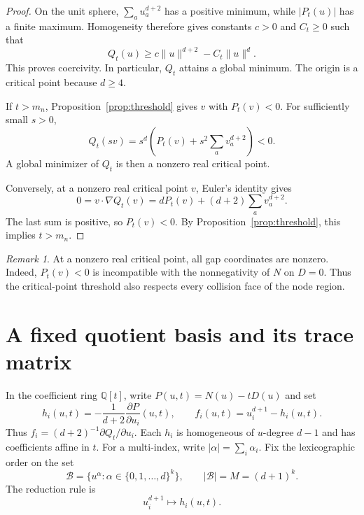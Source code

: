 \documentclass[11pt,leqno]{amsart}
\theoremstyle{definition}
\theoremstyle{remark}
\newtheorem{remark}[theorem]{Remark}
\numberwithin{equation}{section}
\newcommand{\Q}{\mathbb Q}
\newcommand{\B}{\mathcal B}
\newcommand{\abs}[1]{\lvert #1\rvert}
\newcommand{\norm}[1]{\lVert #1\rVert}
\begin{document}
\begin{proof}
On the unit sphere, $\sum_a u_a^{d+2}$ has a positive minimum, while
$\abs{P_t(u)}$ has a finite maximum. Homogeneity therefore gives constants
$c>0$ and $C_t\geq0$ such that
\[
 Q_t(u)\geq c\norm{u}^{d+2}-C_t\norm{u}^{d}.
\]
This proves coercivity. In particular, $Q_t$ attains a global minimum.
The origin is a critical point because $d\geq4$.

If $t>m_n$, Proposition~\ref{prop:threshold} gives $v$ with $P_t(v)<0$.
For sufficiently small $s>0$,
\[
 Q_t(sv)=s^d\left(P_t(v)+s^2\sum_a v_a^{d+2}\right)<0.
\]
A global minimizer of $Q_t$ is then a nonzero real critical point.

Conversely, at a nonzero real critical point $v$, Euler's identity gives
\begin{equation}\label{eq:euler}
 0=v\cdot\nabla Q_t(v)
   =dP_t(v)+(d+2)\sum_a v_a^{d+2}.
\end{equation}
The last sum is positive, so $P_t(v)<0$. By
Proposition~\ref{prop:threshold}, this implies $t>m_n$.
\end{proof}

\begin{remark}
At a nonzero real critical point, all gap coordinates are nonzero.
Indeed, $P_t(v)<0$ is incompatible with the nonnegativity of $N$ on
$D=0$. Thus the critical-point threshold also respects every collision
face of the node region.
\end{remark}

\section{A fixed quotient basis and its trace matrix}\label{sec:quotient}

In the coefficient ring $\Q[t]$, write $P(u,t)=N(u)-tD(u)$ and set
\begin{equation}\label{eq:relations}
 h_i(u,t)=-\frac{1}{d+2}\frac{\partial P}{\partial u_i}(u,t),
 \qquad f_i(u,t)=u_i^{d+1}-h_i(u,t).
\end{equation}
Thus $f_i=(d+2)^{-1}\partial Q_t/\partial u_i$.
Each $h_i$ is homogeneous of $u$-degree $d-1$ and has coefficients
affine in $t$. For a multi-index, write $\abs{\alpha}=\sum_i\alpha_i$.
Fix the lexicographic order on the set
\begin{equation}\label{eq:basis}
 \B=\{u^\alpha:\alpha\in\{0,1,\ldots,d\}^k\},
 \qquad \abs{\B}=M=(d+1)^k.
\end{equation}
The reduction rule is
\begin{equation}\label{eq:rewrite}
 u_i^{d+1}\longmapsto h_i(u,t).
\end{equation}
\end{document}
